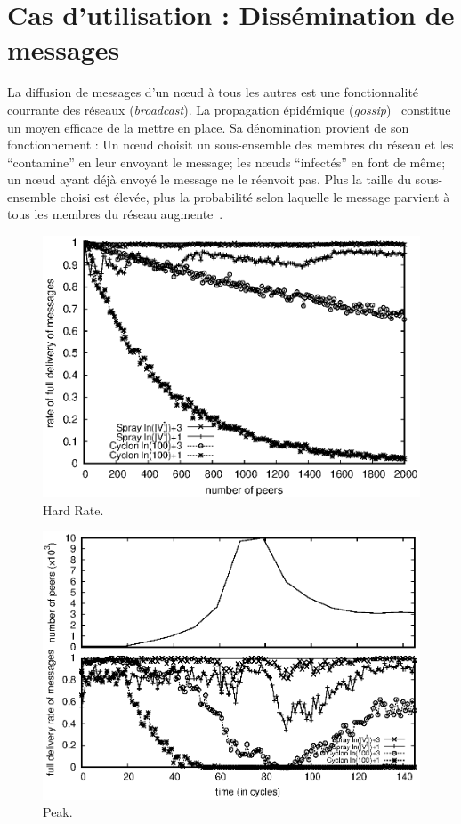 
\section{Cas d'utilisation : Dissémination de messages}

La diffusion de messages d'un nœud à tous les autres est une fonctionnalité
courrante des réseaux (\emph{broadcast}). La propagation épidémique
(\emph{gossip})~\cite{birman1999bimodal} constitue un moyen efficace de la
mettre en place. Sa dénomination provient de son fonctionnement : Un nœud
choisit un sous-ensemble des membres du réseau et les ``contamine'' en leur
envoyant le message; les nœuds ``infectés'' en font de même; un nœud ayant déjà
envoyé le message ne le réenvoit pas. Plus la taille du sous-ensemble choisi est
élevée, plus la probabilité selon laquelle le message parvient à tous les
membres du réseau augmente~\cite{erdos1959random}.

\begin{figure}
  \begin{center}
    \includegraphics[width=.8\textwidth]{img/spray/hardrate.eps}
    \caption[Hard Rate]{\label{net:fig:hardrate} Hard Rate.}
  \end{center}
\end{figure}


\begin{figure}
  \begin{center}
    \includegraphics[width=.8\textwidth]{img/spray/peak.eps}
    \caption[Peak]{\label{net:fig:peak} Peak.}
  \end{center}
\end{figure}


